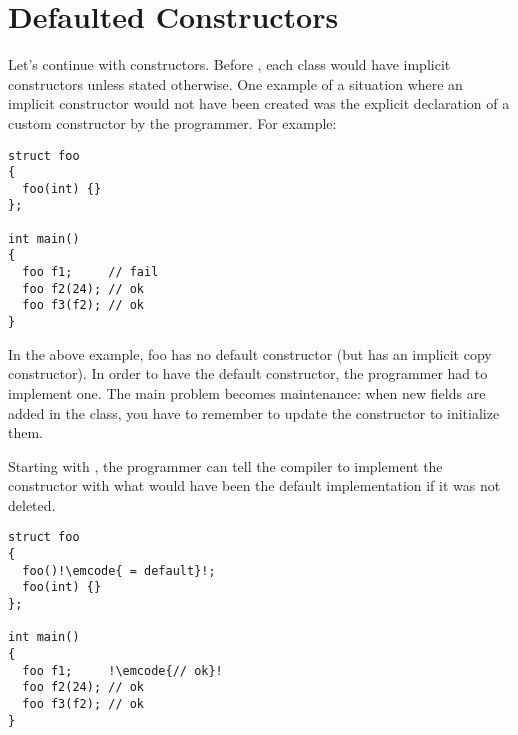 \section{Defaulted Constructors}

Let's continue with constructors. Before , each class would have
implicit constructors unless stated otherwise. One example of a
situation where an implicit constructor would not have been created
was the explicit declaration of a custom constructor by the
programmer. For example:

\begin{lstlisting}
struct foo
{
  foo(int) {}
};

int main()
{
  foo f1;     // fail
  foo f2(24); // ok
  foo f3(f2); // ok
}
\end{lstlisting}

In the above example, foo has no default constructor (but has an
implicit copy constructor). In order to have the default constructor,
the programmer had to implement one. The main problem becomes
maintenance: when new fields are added in the class, you have to
remember to update the constructor to initialize them.

Starting with , the programmer can tell the compiler to
implement the constructor with what would have been the default
implementation if it was not deleted.

\begin{lstlisting}
struct foo
{
  foo()!\emcode{ = default}!;
  foo(int) {}
};

int main()
{
  foo f1;     !\emcode{// ok}!
  foo f2(24); // ok
  foo f3(f2); // ok
}
\end{lstlisting}
